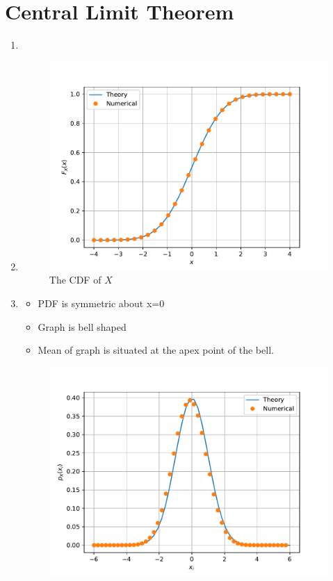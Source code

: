 \documentclass[journal,12pt,twocolumn]{IEEEtran}
\renewcommand\thesection{\arabic{section}}
\begin{document}
    \section{Central Limit Theorem}
    \begin{enumerate}[label=\thesection.\arabic*
,ref=\thesection.\theenumi]
    \item
    \item 
    \begin{figure}[h]
        \centering
        \includegraphics[width=\columnwidth]{../figs/gauss_cdf}
        \caption{The CDF of $X$}\label{fig:gauss_cdf}
        \end{figure}
    \item\solution{}
    \begin{itemize}
        \item PDF is symmetric about x=0\\ 
        \item Graph is bell shaped\\
        \item Mean of graph is situated at the apex point of the bell.
    \end{itemize}
    \begin{figure}[h]
    \centering
    \includegraphics[width=\columnwidth]{../figs/gauss_pdf}

\end{figure}
\end{enumerate}
\end{document}

